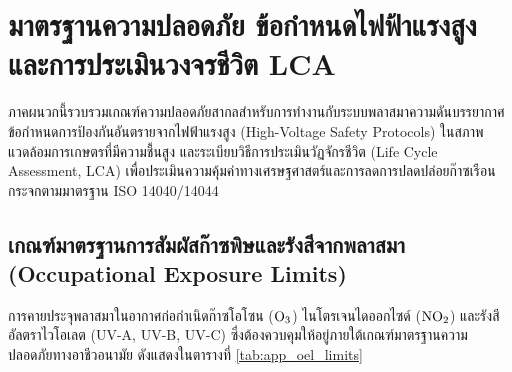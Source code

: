 
\chapter{มาตรฐานความปลอดภัย ข้อกำหนดไฟฟ้าแรงสูง และการประเมินวงจรชีวิต LCA}
\label{app:safety_and_lca}

ภาคผนวกนี้รวบรวมเกณฑ์ความปลอดภัยสากลสำหรับการทำงานกับระบบพลาสมาความดันบรรยากาศ ข้อกำหนดการป้องกันอันตรายจากไฟฟ้าแรงสูง (High-Voltage Safety Protocols) ในสภาพแวดล้อมการเกษตรที่มีความชื้นสูง และระเบียบวิธีการประเมินวัฏจักรชีวิต (Life Cycle Assessment, LCA) เพื่อประเมินความคุ้มค่าทางเศรษฐศาสตร์และการลดการปลดปล่อยก๊าซเรือนกระจกตามมาตรฐาน ISO 14040/14044

\section{เกณฑ์มาตรฐานการสัมผัสก๊าซพิษและรังสีจากพลาสมา (Occupational Exposure Limits)}
\label{app:sec_oel_limits}

การคายประจุพลาสมาในอากาศก่อกำเนิดก๊าซโอโซน ($\ce{O3}$) ไนโตรเจนไดออกไซด์ ($\ce{NO2}$) และรังสีอัลตราไวโอเลต (UV-A, UV-B, UV-C) ซึ่งต้องควบคุมให้อยู่ภายใต้เกณฑ์มาตรฐานความปลอดภัยทางอาชีวอนามัย ดังแสดงในตารางที่ \ref{tab:app_oel_limits}

